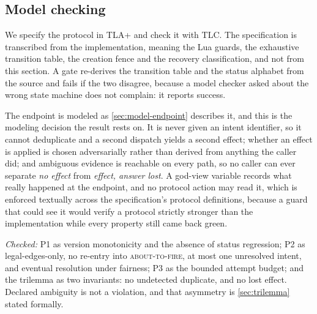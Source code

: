 \subsection{Model checking}
\label{sec:modelchecking}

We specify the protocol in TLA+ and check it with TLC. The specification is
transcribed from the implementation, meaning the Lua guards, the exhaustive
transition table, the creation fence and the recovery classification, and not
from this section. A gate re-derives the transition table and
the status alphabet from the source and fails if the two disagree, because a
model checker asked about the wrong state machine does not complain: it reports
success.

The endpoint is modeled as \cref{sec:model-endpoint} describes it, and this is
the modeling decision the result rests on. It is never given an intent
identifier, so it cannot deduplicate and a second dispatch yields a second
effect; whether an effect is applied is chosen adversarially rather than
derived from anything the caller did; and ambiguous evidence is reachable on
every path, so no caller can ever separate \emph{no effect} from \emph{effect,
answer lost}. A god-view variable records what really happened at the endpoint,
and no protocol action may read it, which is enforced textually across the
specification's protocol definitions, because a guard that could see it would
verify a protocol strictly stronger than the implementation while every
property still came back green.

\emph{Checked:} P1 as version monotonicity and the absence of status
regression; P2 as legal-edges-only, no re-entry into \textsc{about-to-fire}, at
most one unresolved intent, and eventual resolution under fairness; P3 as the
bounded attempt budget; and the trilemma as two invariants: no undetected
duplicate, and no lost effect. Declared ambiguity is not a violation, and that
asymmetry is \cref{sec:trilemma} stated formally.

